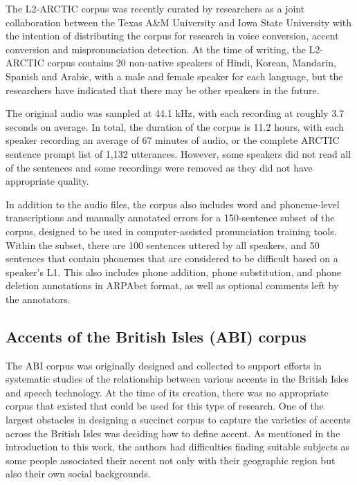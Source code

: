 \documentclass
[
    a4paper,
    twoside,
    12pt,
]
{report}
\begin{document}
The L2-ARCTIC corpus was recently curated by researchers as a joint
collaboration between the Texas A\&M University and Iowa State
University with the intention of distributing the corpus for research in
voice conversion, accent conversion and mispronunciation detection. At
the time of writing, the L2-ARCTIC corpus contains 20 non-native
speakers of Hindi, Korean, Mandarin, Spanish and Arabic, with a male and
female speaker for each language, but the researchers have indicated
that there may be other speakers in the future.

The original audio was sampled at 44.1 kHz, with each recording at
roughly 3.7 seconds on average. In total, the duration of the corpus is
11.2 hours, with each speaker recording an average of 67 minutes of
audio, or the complete ARCTIC sentence prompt list of 1,132 utterances.
However, some speakers did not read all of the sentences and some
recordings were removed as they did not have appropriate quality.

In addition to the audio files, the corpus also includes word and
phoneme-level transcriptions and manually annotated errors for a
150-sentence subset of the corpus, designed to be used in
computer-assisted pronunciation training tools. Within the subset, there
are 100 sentences uttered by all speakers, and 50 sentences that contain
phonemes that are considered to be difficult based on a speaker's L1.
This also includes phone addition, phone substitution, and phone
deletion annotations in ARPAbet format, as well as optional comments
left by the annotators.

\hypertarget{accents-of-the-british-isles-abi-corpus}{%
\subsection{Accents of the British Isles (ABI)
corpus}\label{accents-of-the-british-isles-abi-corpus}}

The ABI corpus was originally designed and collected to support efforts
in systematic studies of the relationship between various accents in the
British Isles and speech technology. At the time of its creation, there
was no appropriate corpus that existed that could be used for this type
of research. One of the largest obstacles in designing a succinct corpus
to capture the varieties of accents across the British Isles was
deciding how to define accent. As mentioned in the introduction to this
work, the authors had difficulties finding suitable subjects as some
people associated their accent not only with their geographic region but
also their own social backgrounds.
\end{document}
